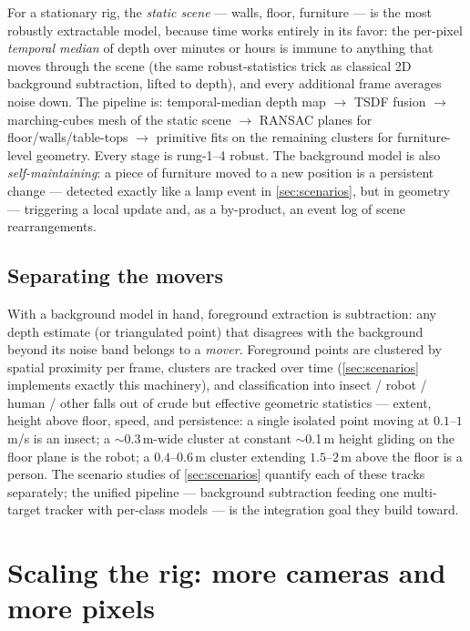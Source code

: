 \documentclass[11pt]{article}
\theoremstyle{definition}
\begin{document}
For a stationary rig, the \emph{static scene} --- walls, floor, furniture
--- is the most robustly extractable model, because time works entirely in
its favor: the per-pixel \emph{temporal median} of depth over minutes or
hours is immune to anything that moves through the scene (the same
robust-statistics trick as classical 2D background subtraction, lifted to
depth), and every additional frame averages noise down. The pipeline is:
temporal-median depth map $\to$ TSDF fusion \cite{CurlessLevoy1996}
$\to$ marching-cubes mesh \cite{Lorensen1987} of the static scene $\to$
RANSAC planes for floor/walls/table-tops $\to$ primitive fits
\cite{Schnabel2007} on the remaining clusters for furniture-level
geometry. Every stage is rung-1--4 robust. The background model is also
\emph{self-maintaining}: a piece of furniture moved to a new position is a
persistent change --- detected exactly like a lamp event in
\autoref{sec:scenarios}, but in geometry --- triggering a local update
and, as a by-product, an event log of scene rearrangements.

\subsection{Separating the movers}
\label{sec:movers}

With a background model in hand, foreground extraction is subtraction:
any depth estimate (or triangulated point) that disagrees with the
background beyond its noise band belongs to a \emph{mover}. Foreground
points are clustered by spatial proximity per frame, clusters are tracked
over time (\autoref{sec:scenarios} implements exactly this machinery),
and classification into insect / robot / human / other falls out of
crude but effective geometric statistics --- extent, height above floor,
speed, and persistence:
a single isolated point moving at $0.1$--$1$\,m/s is an insect; a
$\sim$0.3\,m-wide cluster at constant $\sim$0.1\,m height gliding on the
floor plane is the robot; a $0.4$--$0.6$\,m cluster extending
$1.5$--$2$\,m above the floor is a person. The scenario studies of
\autoref{sec:scenarios} quantify each of these tracks separately; the
unified pipeline --- background subtraction feeding one multi-target
tracker with per-class models --- is the integration goal they build
toward.

\section{Scaling the rig: more cameras and more pixels}
\label{sec:scaling}
\end{document}
